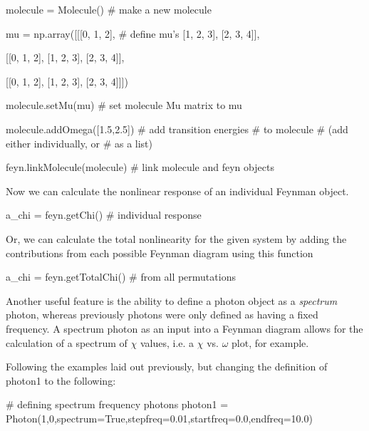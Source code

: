 \documentclass[11pt,a4paper,notitlepage]{article}
\begin{document}
\begin{code}
molecule = Molecule()	# make a new molecule

mu = np.array([[[0, 1, 2],	# define mu's
                [1, 2, 3],
                [2, 3, 4]],
               
               [[0, 1, 2],
                [1, 2, 3],
                [2, 3, 4]],
               
               [[0, 1, 2],
                [1, 2, 3],
                [2, 3, 4]]])

molecule.setMu(mu)		# set molecule Mu matrix to mu

molecule.addOmega([1.5,2.5])	# add transition energies
					# to molecule
					# (add either individually, or
					# as a list)

feyn.linkMolecule(molecule)	# link molecule and feyn objects
\end{code}

Now we can calculate the nonlinear response of an individual Feynman object.

\begin{code}
a_chi = feyn.getChi()	# individual response
\end{code}

Or, we can calculate the total nonlinearity for the given system by adding the contributions from each possible Feynman diagram using this function

\begin{code}
a_chi = feyn.getTotalChi()	# from all permutations
\end{code}

%

Another useful feature is the ability to define a photon object as a \textit{spectrum} photon, whereas previously photons were only defined as having a fixed frequency. A spectrum photon as an input into a Feynman diagram allows for the calculation of a spectrum of $\chi$ values, i.e. a $\chi$ vs. $\omega$ plot, for example.

Following the examples laid out previously, but changing the definition of photon1 to the following:

\begin{code}
# defining spectrum frequency photons
photon1 = Photon(1,0,spectrum=True,stepfreq=0.01,startfreq=0.0,endfreq=10.0)
\end{code}
\end{document}

